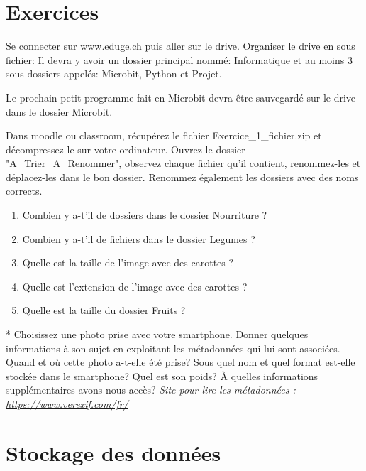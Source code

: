 \documentclass[11pt, a4paper]{book}
\begin{document}
\section{Exercices}

\begin{exercice}
Se connecter sur www.eduge.ch puis aller sur le drive.
 Organiser le drive en sous fichier: Il devra y avoir un dossier principal nommé: Informatique et au moins 3 sous-dossiers appelés: Microbit, Python et Projet. 
 
 Le prochain petit programme fait en Microbit devra être sauvegardé sur le drive dans le dossier Microbit. 
\end{exercice}


\begin{exercice}
Dans moodle ou classroom, récupérez le fichier Exercice\_1\_fichier.zip et décompressez-le sur votre ordinateur.
Ouvrez le dossier "A\_Trier\_A\_Renommer", observez chaque fichier qu'il contient, renommez-les et déplacez-les dans le bon dossier. Renommez également les dossiers avec des noms corrects.
\begin{enumerate}
    \item Combien y a-t'il de dossiers dans le dossier Nourriture ?
    \item Combien y a-t'il de fichiers dans le dossier Legumes ?
    \item Quelle est la taille de l'image avec des carottes ?
    \item Quelle est l'extension de l'image avec des carottes ?
    \item Quelle est la taille du dossier Fruits ?
\end{enumerate}
\end{exercice}

\begin{exercice} *
Choisissez une photo prise avec votre smartphone. Donner quelques informations à son sujet en exploitant les métadonnées qui lui sont associées. Quand et où cette photo a-t-elle été prise? Sous quel nom et quel format est-elle stockée dans le smartphone? Quel est son poids? À quelles informations supplémentaires avons-nous accès?
\textit{Site pour lire les métadonnées : \url{https://www.verexif.com/fr/}}
\end{exercice}


\section{Stockage des données}
\end{document}
